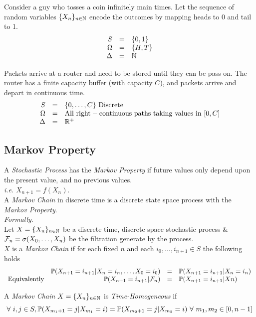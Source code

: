 \documentclass[11pt,a4paper]{article}
\begin{document}
Consider a guy who tosses a coin infinitely main times. Let the sequence of random variables $\{X_n\}_{n\in\mathbb{N}}$ encode the outcomes by mapping heads to 0 and tail to 1.
\[\begin{array}{rcl}
S&=&\{0,1\}\\
\Omega&=&\{H,T\}\\
\Delta&=&\mathbb{N}
\end{array}\]

Packets arrive at a router and need to be stored until they can be pass on. The router has a finite capacity buffer (with capacity $C$), and packets arrive and depart in continuous time.
\[\begin{array}{rcl}
S&=&\{0,\dots,C\}\ \mathrm{Discrete}\\
\Omega&=&\mathrm{All\ right-continuous\ paths\ taking\ values\ in\ }[0,C]\\
\Delta&=&\real^+
\end{array}\]

\subsection{Markov Property}

A \textit{Stochastic Process} has the \textit{Markov Property} if future values only depend upon the present value, and no previous values.\\
\textit{i.e.} $X_{n+1}=f(X_n)$.\\

A \textit{Markov Chain} in discrete time is a discrete state space process with the \textit{Markov Property}.\\
\textit{Formally}.\\
Let $X=\{X_n\}_{n\in\mathbb{N}}$ be a discrete time, discrete space stochastic process \& $\mathcal{F}_n=\sigma(X_0,\dots,X_n)$ be the filtration generate by the process.\\
$X$ is a \textit{Markov Chain} if for each fixed $n$ and each $i_0,\dots,i_{n+1}\in S$ the following holds
\[\begin{array}{rrcl}
&\mathbb{P}(X_{n+1}=i_{n+1}|X_n=i_n,\dots,X_0=i_0)&=&\mathbb{P}(X_{n+1}=i_{n+1}|X_n=i_n)\\
\mathrm{Equivalently}&\mathbb{P}(X_{n+1}=i_{n+1}|\mathcal{F}_n)&=&\mathbb{P}(X_{n+1}=i_{n+1}|Xn)
\end{array}\]

A \textit{Markov Chain} $X=\{X_n\}_{n\in\mathbb{N}}$ is \textit{Time-Homogeneous} if
$$\forall\ i,j\in S, \prob(X_{m_1+1}=j|X_{m_1}=i)=\prob(X_{m_2+1}=j|X_{m_2}=i)\ \forall\ m_1,m_2\in[0,n-1]$$
\end{document}
